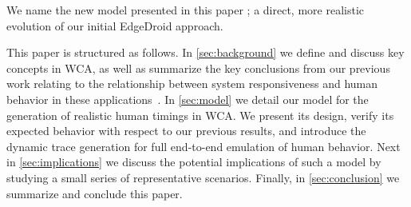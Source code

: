 We name the new model presented in this paper \emph{\edgedroid}; a direct, more realistic evolution of our initial EdgeDroid approach.

This paper is structured as follows.
In \cref{sec:background} we define and discuss key concepts in \ac{WCA}, as well as summarize the key conclusions from our previous work relating to the relationship between system responsiveness and human behavior in these applications~\cite{olguinmunoz:impact2021}.
In \cref{sec:model} we detail our model for the generation of realistic human timings in \ac{WCA}.
We present its design, verify its expected behavior with respect to our previous results, and introduce the dynamic trace generation for full end-to-end emulation of human behavior.
Next in \cref{sec:implications} we discuss the potential implications of such a model by studying a small series of representative scenarios.
Finally, in \cref{sec:conclusion} we summarize and conclude this paper.


